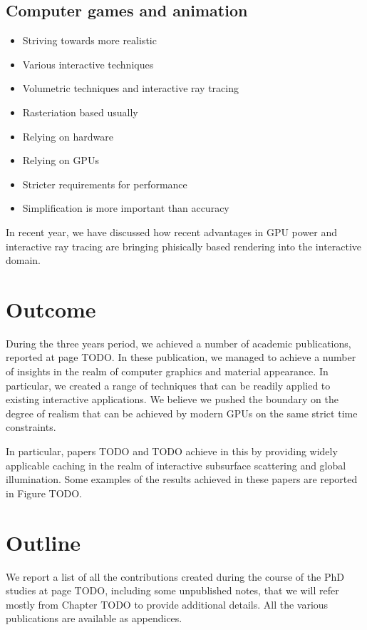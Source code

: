 \subsection{Computer games and animation}
\begin{itemize}
\item Striving towards more realistic
\item Various interactive techniques
\item Volumetric techniques and interactive ray tracing
\item Rasteriation based usually
\item Relying on hardware
\item Relying on GPUs
\item Stricter requirements for performance
\item Simplification is more important than accuracy
\end{itemize}

In recent year, we have discussed how recent advantages in GPU power and interactive ray tracing are bringing phisically based rendering into the interactive domain. 

\section{Outcome}

During the three years period, we achieved a number of academic publications, reported at page TODO. In these publication, we managed to achieve a number of insights in the realm of computer graphics and material appearance. In particular, we created a range of techniques that can be readily applied to existing interactive applications. We believe we pushed the boundary on the degree of realism that can be achieved by modern GPUs on the same strict time constraints. 

In particular, papers TODO and TODO achieve in this by providing widely applicable caching in the realm of interactive subsurface scattering and global illumination. Some examples of the results achieved in these papers are reported in Figure TODO.

\section{Outline}

We report a list of all the contributions created during the course of the PhD studies at page TODO, including some unpublished notes, that we will refer mostly from Chapter TODO to provide additional details. All the various publications are available as appendices. 

